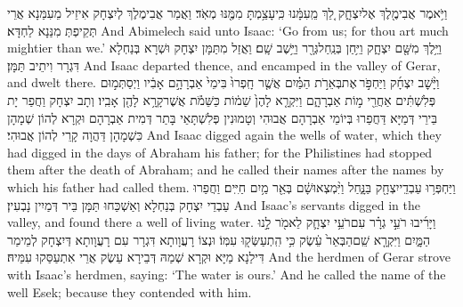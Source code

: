 {וַיֹּ֥אמֶר אֲבִימֶ֖לֶךְ אֶל\maqqaf יִצְחָ֑ק לֵ֚ךְ מֵֽעִמָּ֔נוּ כִּֽי\maqqaf עָצַ֥מְתָּ מִמֶּ֖נּוּ מְאֹֽד׃}
{וַאֲמַר אֲבִימֶלֶךְ לְיִצְחָק אִיזֵיל מֵעִמַּנָא אֲרֵי תְּקֵיפְתְּ מִנַּנָא לַחְדָּא׃}
{And Abimelech said unto Isaac: ‘Go from us; for thou art much mightier than we.’}{}
{וַיֵּ֥לֶךְ מִשָּׁ֖ם יִצְחָ֑ק וַיִּ֥חַן בְּנַֽחַל\maqqaf גְּרָ֖ר וַיֵּ֥שֶׁב שָֽׁם׃}
{וַאֲזַל מִתַּמָּן יִצְחָק וּשְׁרָא בְּנַחְלָא דִּגְרָר וִיתֵיב תַּמָּן׃}
{And Isaac departed thence, and encamped in the valley of Gerar, and dwelt there.}{}
{וַיָּ֨שׇׁב יִצְחָ֜ק וַיַּחְפֹּ֣ר \legarmeh  אֶת\maqqaf בְּאֵרֹ֣ת הַמַּ֗יִם אֲשֶׁ֤ר חָֽפְרוּ֙ בִּימֵי֙ אַבְרָהָ֣ם אָבִ֔יו וַיְסַתְּמ֣וּם פְּלִשְׁתִּ֔ים אַחֲרֵ֖י מ֣וֹת אַבְרָהָ֑ם וַיִּקְרָ֤א לָהֶן֙ שֵׁמ֔וֹת כַּשֵּׁמֹ֕ת אֲשֶׁר\maqqaf קָרָ֥א לָהֶ֖ן אָבִֽיו׃}
{וְתָב יִצְחָק וַחֲפַר יָת בֵּירֵי דְּמַיָּא דַּחֲפַרוּ בְּיוֹמֵי אַבְרָהָם אֲבוּהִי וְטָמוּנִין פְּלִשְׁתָּאֵי בָּתַר דְּמִית אַבְרָהָם וּקְרָא לְהוֹן שְׁמָהָן כִּשְׁמָהָן דַּהֲוָה קָרֵי לְהוֹן אֲבוּהִי׃}
{And Isaac digged again the wells of water, which they had digged in the days of Abraham his father; for the Philistines had stopped them after the death of Abraham; and he called their names after the names by which his father had called them.}{}
{וַיַּחְפְּר֥וּ עַבְדֵֽי\maqqaf יִצְחָ֖ק בַּנָּ֑חַל וַיִּ֨מְצְאוּ\maqqaf שָׁ֔ם בְּאֵ֖ר מַ֥יִם חַיִּֽים׃}
{וַחֲפַרוּ עַבְדֵי יִצְחָק בְּנַחְלָא וְאַשְׁכַּחוּ תַּמָּן בֵּיר דְּמַיִין נָבְעִין׃}
{And Isaac’s servants digged in the valley, and found there a well of living water.}{}
{וַיָּרִ֜יבוּ רֹעֵ֣י גְרָ֗ר עִם\maqqaf רֹעֵ֥י יִצְחָ֛ק לֵאמֹ֖ר לָ֣נוּ הַמָּ֑יִם וַיִּקְרָ֤א שֵֽׁם\maqqaf הַבְּאֵר֙ עֵ֔שֶׂק כִּ֥י הִֽתְעַשְּׂק֖וּ עִמּֽוֹ׃}
{וּנְצוֹ רָעֲוָותָא דִּגְרָר עִם רָעֲוָותָא דְּיִצְחָק לְמֵימַר דִּילַנָא מַיָּא וּקְרָא שְׁמַהּ דְּבֵירָא עֵשֶׂק אֲרֵי אִתְעַסַּקוּ עִמֵּיהּ׃}
{And the herdmen of Gerar strove with Isaac’s herdmen, saying: ‘The water is ours.’ And he called the name of the well Esek; because they contended with him.}{}
